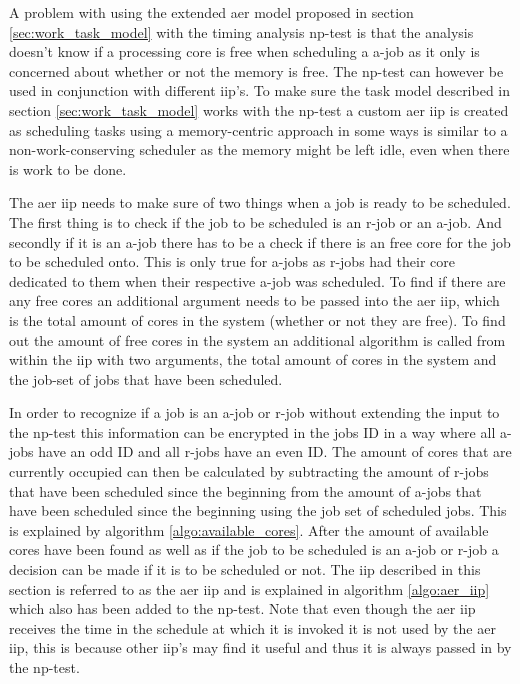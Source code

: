 \documentclass{kththesis}
\begin{document}
A problem with using the extended \acrshort{aer} model proposed in section
\ref{sec:work_task_model} with the timing analysis \acrshort{np}-test is that the analysis doesn't
know if a processing core is free when scheduling a \acrshort{a}-job as it only is concerned about
whether or not the memory is free. The \acrshort{np}-test can however be used in conjunction with
different \acrshort{iip}'s. To make sure the task model described in section
\ref{sec:work_task_model} works with the \acrshort{np}-test a custom \acrshort{aer} \acrshort{iip}
is created as scheduling tasks using a memory-centric approach in some ways is similar to a
non-work-conserving scheduler as the memory might be left idle, even when there is work to be done.

The \acrshort{aer} \acrshort{iip} needs to make sure of two things when a job is ready to be
scheduled. The first thing is to check if the job to be scheduled is an \acrshort{r}-job or an
\acrshort{a}-job. And secondly if it is an \acrshort{a}-job there has to be a check if there is an
free core for the job to be scheduled onto. This is only true for \acrshort{a}-jobs as
\acrshort{r}-jobs had their core dedicated to them when their respective \acrshort{a}-job was
scheduled. To find if there are any free cores an additional argument needs to be passed into the
\acrshort{aer} \acrshort{iip}, which is the total amount of cores in the system (whether
or not they are free). To find out the amount of free cores in the system an additional algorithm is
called from within the \acrshort{iip} with two arguments, the total amount of cores in the system
and the job-set of jobs that have been scheduled. 

In order to recognize if a job is an \acrshort{a}-job or \acrshort{r}-job without extending the
input to the \acrshort{np}-test this information can be encrypted in the jobs ID in a way where all
\acrshort{a}-jobs have an odd ID and all \acrshort{r}-jobs have an even ID. The amount of cores that
are currently occupied can then be calculated by subtracting the amount of \acrshort{r}-jobs that
have been scheduled since the beginning from the amount of \acrshort{a}-jobs that have been
scheduled since the beginning using the job set of scheduled jobs. This is explained by algorithm
\ref{algo:available_cores}. After the amount of available cores have been found as well as if the
job to be scheduled is an \acrshort{a}-job or \acrshort{r}-job a decision can be made if it is to be
scheduled or not. The \acrshort{iip} described in this section is referred to as the \acrshort{aer}
\acrshort{iip} and is explained in algorithm \ref{algo:aer_iip} which also has been added to the
\acrshort{np}-test. Note that even though the \acrshort{aer} \acrshort{iip} receives the time in the
schedule at which it is invoked it is not used by the \acrshort{aer} \acrshort{iip}, this is because
other \acrshort{iip}'s may find it useful and thus it is always passed in by the \acrshort{np}-test.
\end{document}
